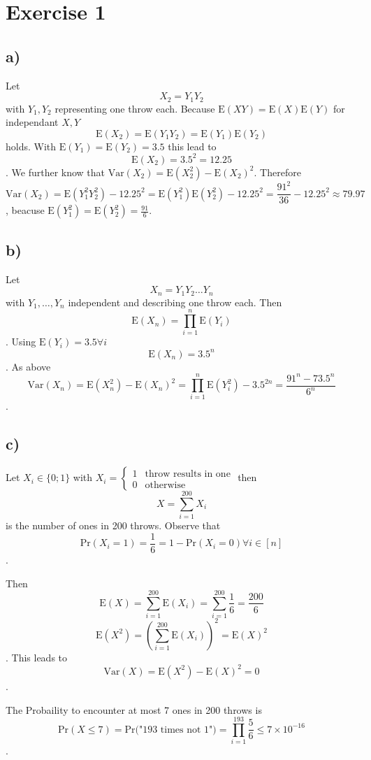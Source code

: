\section*{Exercise 1}
\subsection*{a)}
Let \[X_2=Y_1Y_2\] with $Y_1,Y_2$ representing one throw each.
Because $\text{E}(XY)=\text{E}(X)\text{E}(Y)$ for independant $X,Y$ 
\[\text{E}(X_2) = \text{E}(Y_1Y_2) = \text{E}(Y_1) \text{E}(Y_2) \] holds.
With $\text{E}(Y_1)=\text{E}(Y_2)=3.5$ this lead to
\[\text{E}(X_2)= 3.5^2 = 12.25 \].
We further know that $\text{Var}(X_2) = \text{E}(X_2^2) - \text{E}(X_2)^2$.
Therefore \[\text{Var}(X_2) = \text{E}(Y_1^2Y_2^2) - 12.25^2 = \text{E}(Y_1^2)\text{E}(Y_2^2)-12.25^2 = \frac{91^2}{36} -12.25^2 \approx 79.97 \], beacuse $\text{E}(Y_1^2)=\text{E}(Y_2^2)=\frac{91}{6}$.

\subsection*{b)}

Let \[X_n = Y_1Y_2\ldots Y_n\] with $Y_1,\ldots,Y_n$ independent and describing one throw each.
Then \[\text{E}(X_n) = \prod_{i=1}^{n}\text{E}(Y_i)\].
Using $\text{E}(Y_i) = 3.5 \forall i$ \[\text{E}(X_n)=3.5^n\].
As above \[
\text{Var}(X_n)= \text{E}(X_n^2)-\text{E}(X_n)^2= \prod_{i=1}^{n}\text{E}(Y_i^2)-3.5^{2n} = \frac{91^n-73.5^n}{6^n}\].

\subsection*{c)}
Let $X_i\in \lbrace0;1\rbrace$ with $X_i = \begin{cases}
1 & \text{throw results in one}\\0&\text{otherwise}
\end{cases}$ then \[X = \sum_{i=1}^{200}X_i\] is the number of ones in 200 throws.
Observe that \[\text{Pr}(X_i=1) = \frac{1}{6}= 1- \text{Pr}(X_i=0) \forall i\in [n]\].

Then \[\text{E}(X)=\sum_{i=1}^{200}\text{E}(X_i)=\sum_{i=1}^{200}\frac{1}{6} = \frac{200}{6}\]
\[\text{E}(X^2)=\left(\sum_{i=1}^{200}\text{E}(X_i)\right)^2 = \text{E}(X)^2\].
This leads to \[\text{Var}(X) = \text{E}(X^2)-\text{E}(X)^2 = 0\].

The Probaility to encounter at most 7 ones in 200 throws is \[\text{Pr}(X\le7) = \text{Pr("193 times not 1")} = \prod_{i=1}^{193}\frac{5}{6}\le7\times10^{-16}\].



